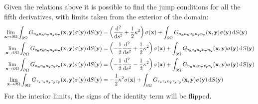 \documentclass[preprint,12pt,3p]{elsarticle}
\newcommand{\dd}{ {\rm d} }
\begin{document}
Given the relations above it is possible to find the jump conditions for all the fifth derivatives, with limits taken from the exterior of the domain:
\begin{align}
    \lim_{\mathbf{x} \rightarrow \partial \Omega} \int_{\partial\Omega} G_{n_\mathbf{x}n_\mathbf{x}n_\mathbf{y} n_\mathbf{y} n_\mathbf{y}}(\mathbf{x},\mathbf{y}) \sigma(\mathbf{y}) \, \dd S(\mathbf{y}) &= \left( \frac{\dd^2}{\dd s^2} + \frac{1}{2} \kappa^2 \right) \sigma(\mathbf{x}) + \int_{\partial\Omega} G_{n_\mathbf{x}n_\mathbf{x}n_\mathbf{y} n_\mathbf{y} n_\mathbf{y}}(\mathbf{x},\mathbf{y}) \sigma(\mathbf{y}) \, \dd S(\mathbf{y}) \\
    \lim_{\mathbf{x} \rightarrow \partial \Omega} \int_{\partial\Omega} G_{\tau_\mathbf{x}\tau_\mathbf{x}n_\mathbf{y} n_\mathbf{y} n_\mathbf{y}}(\mathbf{x},\mathbf{y}) \sigma(\mathbf{y}) \, \dd S(\mathbf{y}) &= \left( - \frac{1}{2} \frac{\dd^2}{\dd s^2} + \frac{1}{2} \kappa^2 \right) \sigma(\mathbf{x}) + \int_{\partial\Omega} G_{\tau_\mathbf{x}\tau_\mathbf{x}n_\mathbf{y} n_\mathbf{y} n_\mathbf{y}}(\mathbf{x},\mathbf{y}) \sigma(\mathbf{y}) \, \dd S(\mathbf{y}) \\
    \lim_{\mathbf{x} \rightarrow \partial \Omega} \int_{\partial\Omega} G_{n_\mathbf{x}n_\mathbf{x}n_\mathbf{y} \tau_\mathbf{y} \tau_\mathbf{y}}(\mathbf{x},\mathbf{y}) \sigma(\mathbf{y}) \, \dd S(\mathbf{y}) &= \left( - \frac{1}{2} \frac{\dd^2}{\dd s^2} - \frac{1}{2} \kappa^2 \right) \sigma(\mathbf{x}) + \int_{\partial\Omega} G_{n_\mathbf{x}n_\mathbf{x}n_\mathbf{y} \tau_\mathbf{y} \tau_\mathbf{y}}(\mathbf{x},\mathbf{y}) \sigma(\mathbf{y}) \, \dd S(\mathbf{y}) \\
    \lim_{\mathbf{x} \rightarrow \partial \Omega} \int_{\partial\Omega} G_{\tau_\mathbf{x}\tau_\mathbf{x}n_\mathbf{y} \tau_\mathbf{y} \tau_\mathbf{y}}(\mathbf{x},\mathbf{y}) \sigma(\mathbf{y}) \, \dd S(\mathbf{y}) &=  - \frac{1}{2} \kappa^2  \sigma(\mathbf{x}) + \int_{\partial\Omega} G_{\tau_\mathbf{x}\tau_\mathbf{x}n_\mathbf{y} \tau_\mathbf{y} \tau_\mathbf{y}}(\mathbf{x},\mathbf{y}) \sigma(\mathbf{y}) \, \dd S(\mathbf{y}) 
\end{align}
For the interior limits, the signs of the identity term will be flipped. 


   
  
\end{document}
